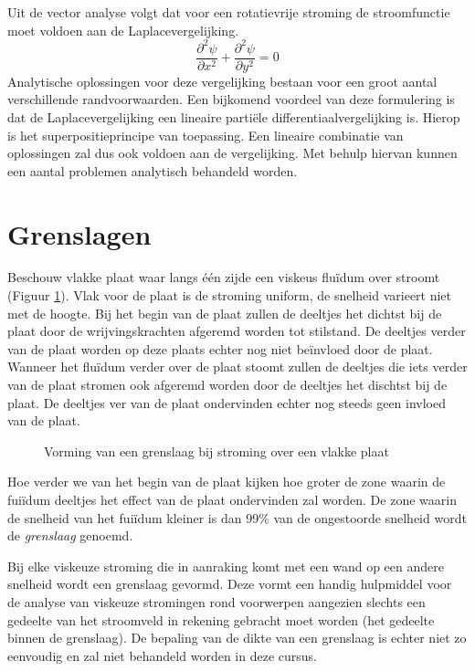 Uit de vector analyse volgt dat voor een rotatievrije stroming de stroomfunctie moet voldoen aan de Laplacevergelijking.
\begin{equation}
	\frac{\partial^2 \psi}{\partial x^2} + \frac{\partial^2 \psi}{\partial y^2} = 0
	\label{eqn:laplacevergelijking}
\end{equation}
Analytische oplossingen voor deze vergelijking bestaan voor een groot aantal verschillende randvoorwaarden. Een bijkomend voordeel van deze formulering is dat de Laplacevergelijking een lineaire partiële differentiaalvergelijking is. Hierop is het superpositieprincipe van toepassing. Een lineaire combinatie van oplossingen zal dus ook voldoen aan de vergelijking. Met behulp hiervan kunnen een aantal problemen analytisch behandeld worden.

	\section{Grenslagen}
	\label{sec:Grenslagen}
Beschouw vlakke plaat waar langs één zijde een viskeus fluïdum over stroomt (Figuur \ref{fig:Laminaire grenslaag}). Vlak voor de plaat is de stroming uniform, de snelheid varieert niet met de hoogte. Bij het begin van de plaat zullen de deeltjes het dichtst bij de plaat door de wrijvingskrachten afgeremd worden tot stilstand. De deeltjes verder van de plaat worden op deze plaats echter nog niet beïnvloed door de plaat. Wanneer het fluïdum verder over de plaat stoomt zullen de deeltjes die iets verder van de plaat stromen ook afgeremd worden door de deeltjes het dischtst bij de plaat. De deeltjes ver van de plaat ondervinden echter nog steeds geen invloed van de plaat.
\begin{figure}[htb]
	\centering
	
	\caption{Vorming van een grenslaag bij stroming over een vlakke plaat}
	\label{fig:Laminaire grenslaag}
\end{figure}

Hoe verder we van het begin van de plaat kijken hoe groter de zone waarin de fuiïdum deeltjes het effect van de plaat ondervinden zal worden. De zone waarin de snelheid van het fuiïdum kleiner is dan 99\% van de ongestoorde snelheid wordt de \emph{grenslaag} genoemd.

Bij elke viskeuze stroming die in aanraking komt met een wand op een andere snelheid wordt een grenslaag gevormd. Deze vormt een handig hulpmiddel voor de analyse van viskeuze stromingen rond voorwerpen aangezien slechts een gedeelte van het stroomveld in rekening gebracht moet worden (het gedeelte binnen de grenslaag). De bepaling van de dikte van een grenslaag is echter niet zo eenvoudig en zal niet behandeld worden in deze cursus.

